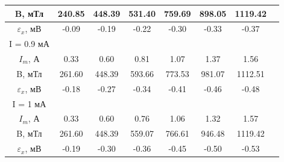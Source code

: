 \documentclass[a4paper,12pt]{article} %
\begin{document}
\begin{table}[H]
\begin{center}
\begin{tabular}{|c|c|c|c|c|c|c|c|}
\hline
B, мТл & 240.85 & 448.39 & 531.40 & 759.69 & 898.05 & 1119.42 \\ 
\hline
$\varepsilon_x$, мВ & -0.09 & -0.19 & -0.22 & -0.30 & -0.33 & -0.37 \\
\hline
I = 0.9 мА&&&&&&\\
\hline
$I_m$, А & 0.33 & 0.60 & 0.81 & 1.07 & 1.37 & 1.56\\
\hline
B, мТл & 261.60 & 448.39 & 593.66 & 773.53 & 981.07 & 1112.51 \\ 
\hline
$\varepsilon_x$, мВ & -0.18 & -0.27 & -0.34 & -0.41 & -0.46 & -0.48 \\ 
\hline
I = 1 мА&&&&&&\\
\hline
$I_m$, А & 0.33 & 0.60 & 0.76 & 1.06 & 1.32 & 1.57 \\ 
\hline
B, мТл & 261.60 & 448.39 & 559.07 & 766.61 & 946.48 & 1119.42\\ 
\hline
$\varepsilon_x$, мВ & -0.19 & -0.30 & -0.36 & -0.45 & -0.50 & -0.53 \\ 
\hline
\end{tabular}
\end{center}
\label{table1:ref}
\end{table}
\end{document}

